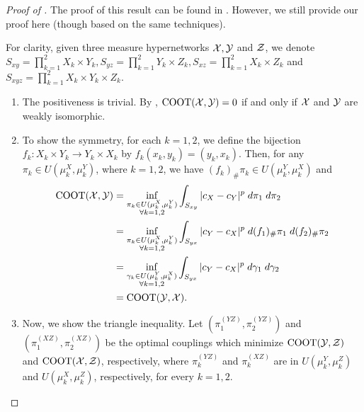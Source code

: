\begin{proof}[Proof of ]
  The proof of this result can be found in \citep{Chowdhury21b}.
  However, we still provide our proof here (though based on the same techniques).

  For clarity, given three measure hypernetworks $\mathcal X, \mathcal Y$ and $\mathcal Z$,
  we denote $S_{xy} = \prod_{k=1}^2 X_k \times Y_k, S_{yz} = \prod_{k=1}^2 Y_k \times Z_k,
  S_{xz} = \prod_{k=1}^2 X_k \times Z_k$ and $S_{xyz} = \prod_{k=1}^2 X_k \times Y_k \times Z_k$.
  \begin{enumerate}
    \item The positiveness is trivial. By ,
    $\text{COOT}(\mathcal X, \mathcal Y) = 0$ if and only if $\mathcal X$ and $\mathcal Y$ are weakly isomorphic.

    \item To show the symmetry, for each $k = 1, 2$, we define the bijection
    $f_k: X_k \times Y_k \to Y_k \times X_k$ by $f_k(x_k,y_k) = (y_k,x_k)$.
    Then, for any $\pi_k \in U(\mu_k^X, \mu_k^Y)$, where $k=1,2$, we have
    $(f_k)_{\#} \pi_k \in U(\mu_k^Y, \mu_k^X)$ and
    \begin{equation}
      \begin{split}
        \text{COOT}(\mathcal X, \mathcal Y) &= \inf_{\substack{\pi_k \in U(\mu^X_k, \mu^Y_k) \\
        \forall k = 1,2}} \int_{S_{xy}} \vert c_X - c_Y \vert^p \; d \pi_1 \; d \pi_2 \\
        &= \inf_{\substack{\pi_k \in U(\mu^X_k, \mu^Y_k) \\
        \forall k = 1,2}} \int_{S_{yx}} \vert c_Y - c_X \vert^p \; d (f_1)_{\#} \pi_1 \; d (f_2)_{\#} \pi_2 \\
        &= \inf_{\substack{\gamma_k \in U(\mu^Y_k, \mu^X_k) \\
        \forall k = 1,2}} \int_{S_{yx}} \vert c_Y - c_X \vert^p \; d \gamma_1 \; d \gamma_2 \\
        &= \text{COOT}(\mathcal Y, \mathcal X).
      \end{split}
    \end{equation}

    \item Now, we show the triangle inequality. Let $(\pi^{(YZ)}_1, \pi^{(YZ)}_2)$ and
    $(\pi^{(XZ)}_1, \pi^{(XZ)}_2)$ be the optimal couplings which minimize
    $\text{COOT}(\mathcal Y, \mathcal Z)$ and $\text{COOT}(\mathcal X, \mathcal Z)$, respectively, where
    $\pi^{(YZ)}_k$ and $\pi^{(XZ)}_k$ are in $U(\mu_k^Y, \mu_k^Z)$ and $U(\mu_k^X, \mu_k^Z)$,
    respectively, for every $k=1,2$.


\end{enumerate}
\end{proof}
